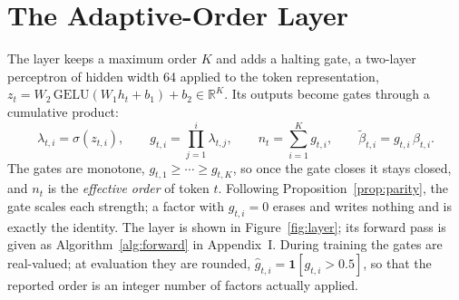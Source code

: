 \section{The Adaptive-Order Layer}
\label{sec:layer}
The layer keeps a maximum order $K$ and adds a halting gate, a two-layer perceptron of hidden width 64 applied to the token representation, $z_t = W_2\,\mathrm{GELU}(W_1 h_t + b_1) + b_2 \in \mathbb{R}^K$. Its outputs become gates through a cumulative product:
\begin{equation}
\lambda_{t,i} = \sigma(z_{t,i}), \qquad
g_{t,i} = \prod_{j=1}^{i} \lambda_{t,j}, \qquad
n_t = \sum_{i=1}^{K} g_{t,i}, \qquad
\tilde\beta_{t,i} = g_{t,i}\, \beta_{t,i}.
\label{eq:gates}
\end{equation}
The gates are monotone, $g_{t,1} \ge \cdots \ge g_{t,K}$, so once the gate closes it stays closed, and $n_t$ is the \emph{effective order} of token $t$. Following Proposition~\ref{prop:parity}, the gate scales each strength; a factor with $g_{t,i} = 0$ erases and writes nothing and is exactly the identity. The layer is shown in Figure~\ref{fig:layer}; its forward pass is given as Algorithm~\ref{alg:forward} in Appendix~I. During training the gates are real-valued; at evaluation they are rounded, $\hat g_{t,i} = \mathbf{1}[g_{t,i} > 0.5]$, so that the reported order is an integer number of factors actually applied.

